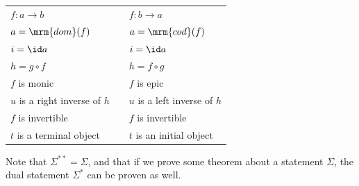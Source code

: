 \documentclass{fkbook}
\theoremstyle{snazzydefinition}
\renewcommand{\dom}{\mrm{dom}}
\renewcommand{\cod}{\mrm{cod}}
\begin{document}
\begin{adjustwidth}{1em}{1em}
\begin{definition}[Duality]
\begin{table}[H]
\begin{tabular}{@{}lll@{}}
        $f : a \to b$ && $f : b \to a$  \\
        $a = \dom(f)$ && $a = \cod(f)$ \\
        $i = \id a$ && $i = \id a$ \\
        $h = g \circ f$ && $h = f \circ g$ \\
        $f$ is monic && $f$ is epic \\
        $u$ is a right inverse of $h$ && $u$ is a left inverse of $h$
        \\
        $f$ is invertible && $f$ is invertible \\
        $t$ is a terminal object && $t$ is an initial object\\
        \bottomrule
      \end{tabular}
    \end{table}
  \end{definition}
  Note that $\Sigma^{**} = \Sigma$, and that if we prove some theorem
  about a statement $\Sigma$, the dual statement $\Sigma^*$ can be
  proven as well.

\end{adjustwidth}
\end{document}
